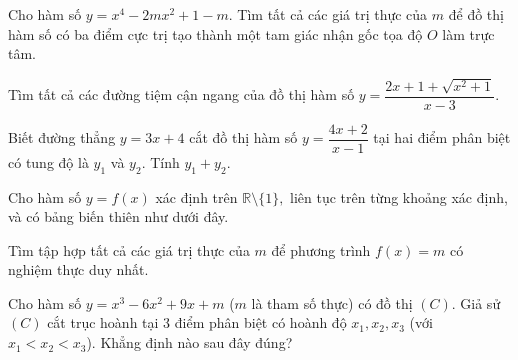 \documentclass[12pt,a4paper]{article}
\begin{document}
\begin{ex}%
Cho hàm số $y=x^4-2mx^2+1-m.$ Tìm tất cả các giá trị thực của $m$ để đồ thị hàm số có ba điểm cực trị tạo thành một tam giác nhận gốc tọa độ $O$ làm trực tâm.
\end{ex}
\begin{ex}%
Tìm tất cả các đường tiệm cận ngang của đồ thị hàm số $y=\dfrac{2x+1+\sqrt{x^2+1}}{x-3}.$
\end{ex}
\begin{ex}%
Biết đường thẳng $y=3x+4$ cắt đồ thị hàm số $y=\dfrac{4x+2}{x-1}$ tại hai điểm phân biệt có tung độ là $y_1$ và $y_2$. Tính $y_1+y_2.$
\end{ex}
\begin{ex}%
Cho hàm số $y=f(x)$ xác định trên $\mathbb{R}\setminus \{1\},$ liên tục trên từng khoảng xác định, và có bảng biến thiên như dưới đây.
\begin{center}
\end{center}
Tìm tập hợp tất cả các giá trị thực của $m$ để phương trình $f(x)=m$ có nghiệm thực duy nhất.
\choice{$[0;+\infty)\cup \{-1\}$}{\True $(0;+\infty)\cup \{-1\}$}{$(0;+\infty)$}{$[0;+\infty)$}
\end{ex}
\begin{ex}%
Cho hàm số $y=x^3-6x^2+9x+m$ ($m$ là tham số thực) có đồ thị $(C)$. Giả sử $(C)$ cắt trục hoành tại 3 điểm phân biệt có hoành độ $x_1,x_2,x_3$ (với $x_1<x_2<x_3$). Khẳng định nào sau đây đúng?
\end{ex}
\end{document}
